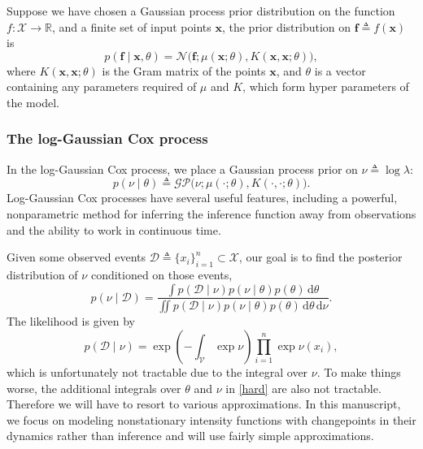 \documentclass{article}
\newcommand{\deq}{\triangleq}
\newcommand{\cm}[1]{\mathcal{#1}}
\newcommand{\data}{\cm{D}}
\newcommand{\given}{\mid}
\newcommand{\R}{\mathbb{R}}
\newcommand{\intd}[1]{\,\mathrm{d}#1}
\begin{document}
Suppose we have chosen a Gaussian process prior distribution on the
function $f\colon \cm{X} \to \R$, and a finite set of input points
$\bm{x}$, the prior distribution on $\bm{f} \deq f(\bm{x})$ is
\begin{equation*}
 p(\bm{f} \given \bm{x}, \theta)
 =
 \cm{N}
 \bigl(
   \bm{f};
   \mu(\bm{x}; \theta),
   K(\bm{x}, \bm{x}; \theta)
 \bigr),
\end{equation*}
where $K(\bm{x}, \bm{x}; \theta)$ is the Gram matrix of the points
$\bm{x}$, and $\theta$ is a vector containing any parameters required
of $\mu$ and $K$, which form hyper parameters of the model.

\subsubsection{The log-Gaussian Cox process}

In the log-Gaussian Cox process, we place a Gaussian process prior on
$\nu \deq \log \lambda$:
\begin{equation*}
  p(\nu \given \theta) 
  \deq 
  \cm{GP}\bigl(\nu; \mu(\cdot; \theta), K(\cdot, \cdot; \theta)\bigr).
\end{equation*}
Log-Gaussian Cox processes have several useful features, including a
powerful, nonparametric method for inferring the inference function
away from observations and the ability to work in continuous time.

Given some observed events $\data \deq \lbrace x_i \rbrace_{i=1}^n
\subset \cm{X}$, our goal is to find the posterior distribution of
$\nu$ conditioned on those events,
\begin{equation}
  \label{nuposterior}
  p(\nu \given \data)
  =
  \frac
  {
    \int p(\data \given \nu)
    p(\nu \given \theta)
    p(\theta) \intd{\theta}
  }
  {
    \iint p(\data \given \nu)
    p(\nu \given \theta) 
    p(\theta) 
    \intd{\theta} \intd{\nu}
  }.
\end{equation}
The likelihood is given by
\begin{equation}
  \label{hard}
  p(\data \given \nu) 
  =
  \exp\left( -\int_{\cm{V}} \exp \nu \right) \prod_{i = 1}^n \exp \nu(x_i),
\end{equation}
which is unfortunately not tractable due to the integral over $\nu$.
To make things worse, the additional integrals over $\theta$ and $\nu$
in \eqref{hard} are also not tractable.  Therefore we will have to
resort to various approximations.  In this manuscript, we focus on
modeling nonstationary intensity functions with changepoints in their
dynamics rather than inference and will use fairly simple
approximations.
\end{document}
